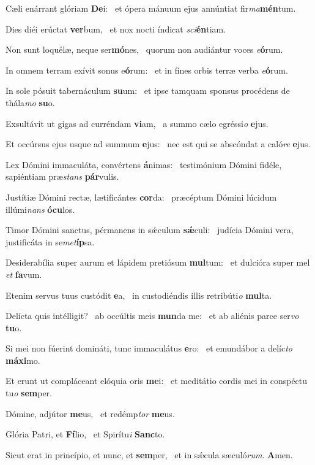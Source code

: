 \item Cæli enárrant glóriam \textbf{De}i:~\psstar{} et ópera mánuum ejus annúntiat fir\textit{ma}\textbf{mén}tum.
\item Dies diéi erúctat \textbf{ver}bum,~\psstar{} et nox nocti índicat \textit{sci}\textbf{én}tiam.
\item Non sunt loquélæ, neque ser\textbf{mó}nes,~\psstar{} quorum non audiántur voces \textit{e}\textbf{ó}rum.
\item In omnem terram exívit sonus e\textbf{ó}rum:~\psstar{} et in fines orbis terræ verba \textit{e}\textbf{ó}rum.
\item In sole pósuit tabernáculum \textbf{su}um:~\psstar{} et ipse tamquam sponsus procédens de thála\textit{mo} \textbf{su}o.
\item Exsultávit ut gigas ad curréndam \textbf{vi}am,~\psstar{} a summo cælo egréssi\textit{o} \textbf{e}jus.
\item Et occúrsus ejus usque ad summum \textbf{e}jus:~\psstar{} nec est qui se abscóndat a caló\textit{re} \textbf{e}jus.
\item Lex Dómini immaculáta, convértens \textbf{á}nimas:~\psstar{} testimónium Dómini fidéle, sapiéntiam præ\textit{stans} \textbf{pár}vulis.
\item Justítiæ Dómini rectæ, lætificántes \textbf{cor}da:~\psstar{} præcéptum Dómini lúcidum illúmi\textit{nans} \textbf{ó}\textbf{cu}los.
\item Timor Dómini sanctus, pérmanens in sǽculum \textbf{sǽ}culi:~\psstar{} judícia Dómini vera, justificáta in se\textit{met}\textbf{íp}sa.
\item Desiderabília super aurum et lápidem pretiósum \textbf{mul}tum:~\psstar{} et dulcióra super mel \textit{et} \textbf{fa}vum.
\item Etenim servus tuus custódit \textbf{e}a,~\psstar{} in custodiéndis illis retribúti\textit{o} \textbf{mul}ta.
\item Delícta quis intélligit?~\pscross{} ab occúltis meis \textbf{mun}da me:~\psstar{} et ab aliénis parce ser\textit{vo} \textbf{tu}o.
\item Si mei non fúerint domináti, tunc immaculátus \textbf{e}ro:~\psstar{} et emundábor a delíc\textit{to} \textbf{má}\textbf{xi}mo.
\item Et erunt ut compláceant elóquia oris \textbf{me}i:~\psstar{} et meditátio cordis mei in conspéctu tu\textit{o} \textbf{sem}per.
\item Dómine, adjútor \textbf{me}us,~\psstar{} et redémp\textit{tor} \textbf{me}us.
\item Glória Patri, et \textbf{Fí}lio,~\psstar{} et Spirítu\textit{i} \textbf{Sanc}to.
\item Sicut erat in princípio, et nunc, et \textbf{sem}per,~\psstar{} et in sǽcula sæculó\textit{rum}. \textbf{A}men.
